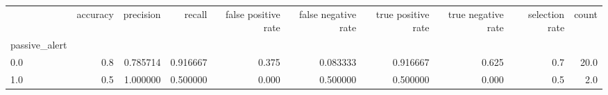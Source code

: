 \begin{tabular}{lrrrrrrrrr}
\toprule
{} &  accuracy &  precision &    recall &  false positive rate &  false negative rate &  true positive rate &  true negative rate &  selection rate &  count \\
passive\_alert &           &            &           &                      &                      &                     &                     &                 &        \\
\midrule
0.0           &       0.8 &   0.785714 &  0.916667 &                0.375 &             0.083333 &            0.916667 &               0.625 &             0.7 &   20.0 \\
1.0           &       0.5 &   1.000000 &  0.500000 &                0.000 &             0.500000 &            0.500000 &               0.000 &             0.5 &    2.0 \\
\bottomrule
\end{tabular}
